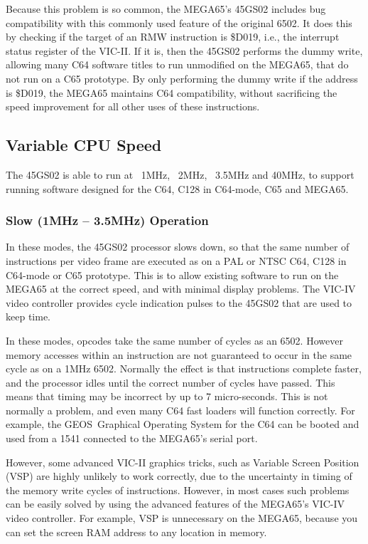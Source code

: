 Because this problem is so common, the MEGA65's 45GS02 includes bug
compatibility with this
commonly used feature of the original 6502.  It does this by checking
if the target of an RMW
instruction is \$D019, i.e., the interrupt status register of the VIC-II.
If it is, then
the 45GS02 performs the dummy write, allowing many C64 software titles
to run unmodified on the
MEGA65, that do not run on a C65 prototype.  By only performing the
dummy write if the address
is \$D019, the MEGA65 maintains C64 compatibility, without sacrificing
the speed improvement
for all other uses of these instructions.

\subsection{Variable CPU Speed}

The 45GS02 is able to run at ~1MHz, ~2MHz, ~3.5MHz and 40MHz,
to support running software
designed for the C64, C128 in C64-mode, C65 and MEGA65.

\subsubsection{Slow (1MHz -- 3.5MHz) Operation}
In these modes, the 45GS02 processor slows down, so that the same number of instructions
per video frame are executed as on a PAL or NTSC C64, C128 in C64-mode or C65 prototype.
This is to allow existing software to run on the MEGA65 at the correct speed, and with
minimal display problems.  The VIC-IV video controller provides cycle indication pulses
to the 45GS02 that are used to keep time.

In these modes, opcodes take the same number of cycles as an 6502.
However memory accesses within an
instruction are not guaranteed to occur in the same cycle as on a 1MHz 6502.  Normally
the effect is that instructions complete faster, and the processor idles until the
correct number of cycles have passed. This means that timing may be incorrect by up to
7 micro-seconds.  This is not normally a problem, and even many C64 fast loaders will
function correctly. For example, the GEOS\texttrademark \ Graphical Operating System for the C64
can be booted and used from a 1541 connected to the MEGA65's serial port.

However, some advanced VIC-II graphics tricks, such as Variable Screen
Position (VSP) are
highly unlikely to work correctly, due to the uncertainty in timing of the memory write
cycles of instructions.  However, in most cases such problems can be
easily solved by using
the advanced features of the MEGA65's VIC-IV video controller.
For example, VSP is unnecessary
on the MEGA65, because you can set the screen RAM address to any location in memory.

